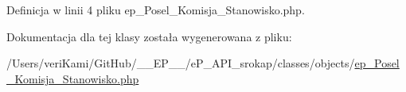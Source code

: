 Definicja w linii 4 pliku ep\-\_\-\-Posel\-\_\-\-Komisja\-\_\-\-Stanowisko.\-php.



Dokumentacja dla tej klasy została wygenerowana z pliku\-:\begin{DoxyCompactItemize}
\item 
/\-Users/veri\-Kami/\-Git\-Hub/\-\_\-\-\_\-\-E\-P\-\_\-\-\_\-/e\-P\-\_\-\-A\-P\-I\-\_\-srokap/classes/objects/\hyperlink{ep___posel___komisja___stanowisko_8php}{ep\-\_\-\-Posel\-\_\-\-Komisja\-\_\-\-Stanowisko.\-php}\end{DoxyCompactItemize}
